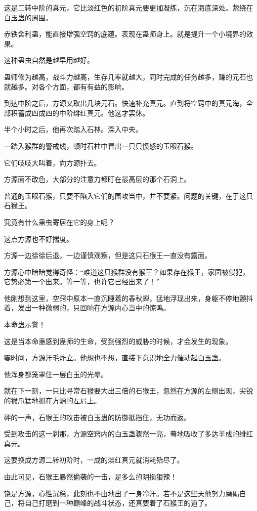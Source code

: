 \begin{this_body}
这是二转中阶的真元，它比淡红色的初阶真元要更加凝练，沉在海底深处。萦绕在白玉蛊的周围。

赤铁舍利蛊，能直接增强空窍的底蕴。表现在蛊师身上。就是提升一个小境界的效果。

这种蛊虫自然是越早用越好。

蛊师修为越高，战斗力越高，生存几率就越大，同时完成的任务越多，赚的元石也就越多。对各个方面，都有有益的影响。

到达中阶之后，方源又取出几块元石。快速补充真元。直到将空窍中的真元海，全部积蓄成四成四的中阶绯红真元。他这才罢休。

半个小时之后，他再次踏入石林。深入中央。

一踏入猴群的警戒线，顿时石柱中冒出一只只愤怒的玉眼石猴。

它们吱吱大叫着，向方源扑去。

方源面不改色，大部分的注意力都盯在最高层的那个石洞上。

普通的玉眼石猴，只要不陷入它们的围攻当中，并不要紧。问题的关键，在于这只石猴王。

究竟有什么蛊虫寄居在它的身上呢？

这点方源也不好揣度。

方源一边徐徐后退，一边谨慎观察，但是这只石猴王一直没有露面。

方源心中暗暗觉得奇怪：“难道这只猴群没有猴王？如果存在猴王，家园被侵犯，它势必第一个出来。等一等，也许它已经出来了！”

他刚想到这里，空窍中原本一直沉睡着的春秋蝉，猛地浮现出来，身躯不停地颤抖着，发出一种微弱的，只回响在方源内心当中的惊鸣。

本命蛊示警！

这是当本命蛊感到蛊师的生命，受到强烈的威胁的时候，才会发生的现象。

霎时间，方源汗毛炸立。他想也不想，直接下意识地全力催动起白玉蛊。

他浑身都笼罩住一层白玉的光晕。

就在下一刻，一只比寻常石猴要大出三倍的石猴王，忽然在方源的左侧出现，尖锐的猴爪猛地抓在方源的左肩上。

砰的一声，石猴王的攻击被白玉蛊的防御抵挡住，无功而返。

受到攻击的这一刹那，方源空窍内的白玉蛊骤然一亮，蓦地吸收了多达半成的绯红真元。

这要换成方源二转初阶时，一成的淡红真元就消耗殆尽了。

由此可见，石猴王暴然偷袭的一击，是多么的阴损狠辣！

饶是方源，心性沉稳，此刻也不由地出了一身冷汗。若不是这些天他努力磨砺自己，将自己打磨到一种巅峰的战斗状态，还真要着了石猴王的道了。


\end{this_body}
